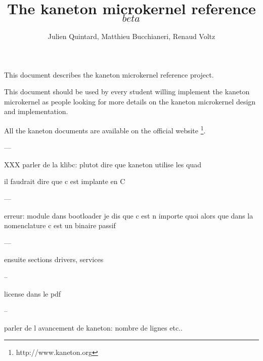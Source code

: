 
%
%



%
%

\rhead{}

%
%

\title{The kaneton microkernel reference $_{beta}$
       \logos}

%
%

\author{\small{Julien Quintard},
        \small{Matthieu Bucchianeri},
        \small{Renaud Voltz}}

%
%



%
%

\maketitle

%
%

%
%

This document describes the kaneton microkernel reference project.

This document should be used by every student willing implement the
kaneton microkernel as people looking for more details on the kaneton
microkernel design and implementation.

All the kaneton documents are available on
the official website
  \footnote{http://www.kaneton.org}.

%
%

\tableofcontents

%
%











%

%
%



---

XXX parler de la klibc: plutot dire que kaneton utilise les quad

il faudrait dire que c est implante en C

---

erreur: module dans bootloader je dis que c est n importe quoi alors
 que dans la nomenclature c est un binaire passif

---

ensuite sections drivers, services

--

license dans le pdf

--

parler de l avancement de kaneton: nombre de lignes etc..
